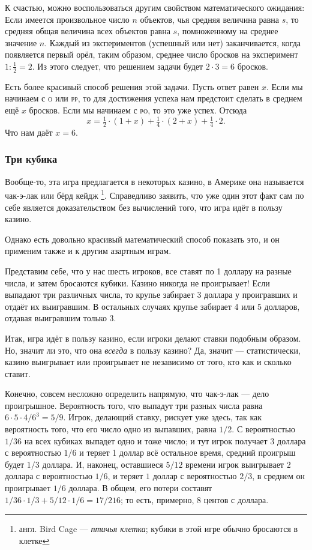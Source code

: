 К счастью, можно воспользоваться другим свойством математического ожидания:
Если имеется произвольное число $n$ объектов, чья средняя величина равна $s$, то средняя общая величина всех объектов равна $s$, помноженному на среднее значение $n$.
Каждый из экспериментов (успешный или нет) заканчивается, когда появляется первый орёл, таким образом, среднее число бросков на эксперимент $1:\tfrac12=2$.
Из этого следует, что
решением задачи будет $2{\cdot}3=6$ бросков.\heart

Есть более красивый способ решения этой задачи.
Пусть ответ равен $x$.
Если мы начинаем с \textsc{о} или \textsc{рр}, то для достижения успеха нам предстоит сделать в среднем ещё $x$ бросков.
Если мы начинаем с \textsc{ро}, то это уже успех.
Отсюда
\[x=\tfrac12 \cdot(1+x)+\tfrac14 \cdot(2+x)+\tfrac14 \cdot2.\]
Что нам даёт $x=6$.

\subsubsection*{Три кубика}%

Вообще-то, эта игра предлагается в некоторых казино, в Америке она называется чак-э-лак или бёрд кейдж%
\footnote{англ. Bird Cage --- \emph{птичья клетка}; кубики в этой игре обычно бросаются в клетке}. 
Справедливо заявить, что уже один этот факт сам по себе является доказательством без вычислений того, что игра идёт в пользу казино.

Однако есть довольно красивый математический способ показать это, и он применим также и к другим азартным играм.

\medskip

Представим себе, что у нас шесть игроков, все ставят по 1 доллару на разные числа, и затем бросаются кубики.
Казино никогда не проигрывает!
Если выпадают три различных числа, то крупье забирает 3 доллара у проигравших и отдаёт их выигравшим.
В остальных случаях крупье забирает 4 или 5 долларов, отдавая выигравшим только 3.
\heart

Итак, игра идёт в пользу казино, если игроки делают ставки подобным образом.
Но, значит ли это, что она \emph{всегда} в пользу казино?
Да, значит --- статистически, казино выигрывает или проигрывает не независимо от того, кто как и сколько ставит.

Конечно, совсем несложно определить напрямую, что чак-э-лак --- дело проигрышное.
Вероятность того, что выпадут три разных числа равна $6{\cdot}5{\cdot}4/6^3=5/9$.
Игрок, делающий ставку, рискует уже здесь, так как вероятность того, что его число одно из выпавших, равна $1/2$.
С вероятностью $1/36$ на всех кубиках выпадет одно и тоже число;
и тут игрок получает $3$ доллара с вероятностью $1/6$ и теряет 1 доллар всё остальное время, средний проигрыш будет $1/3$ доллара.
И, наконец, оставшиеся $5/12$ времени игрок выигрывает $2$ доллара с вероятностью $1/6$, и теряет $1$ доллар с вероятностью $2/3$, в среднем он проигрывает $1/6$ доллара.
В общем, его потери составят $1/36{\cdot}1/3 + 5/12{\cdot}1/6 = 17/216$; то есть, примерно, $8$ центов с доллара.

